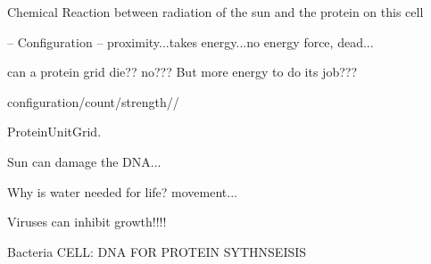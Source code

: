    Chemical Reaction between radiation of the sun and the protein on this cell
   
   -- Configuration -- proximity...takes energy...no energy force, dead...
   
      can a protein grid die??  no???  But more energy to do its job???
      
      configuration/count/strength//
      
  ProteinUnitGrid.


Sun can damage the DNA...

Why is water needed for life?  movement...

Viruses can inhibit growth!!!!

Bacteria CELL:
DNA FOR PROTEIN SYTHNSEISIS

 
 

